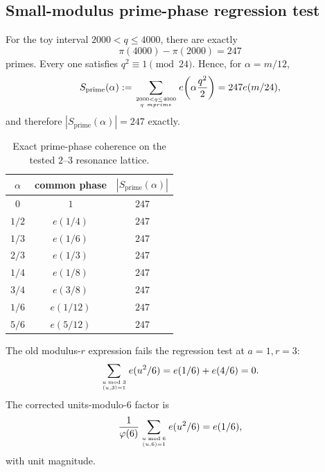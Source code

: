 \documentclass[11pt]{article}
\theoremstyle{definition}
\theoremstyle{remark}
\newcommand{\1}{\mathbf{1}}
\begin{document}
\subsection{Small-modulus prime-phase regression test}
\label{subsec:numerical-prime-resonance}

For the toy interval $2000<q\le4000$, there are exactly
\begin{equation}
 \pi(4000)-\pi(2000)=247
 \label{eq:toy-prime-count}
\end{equation}
primes.  Every one satisfies $q^2\equiv1\pmod{24}$.  Hence, for
$\alpha=m/12$,
\begin{equation}
 S_{\mathrm{prime}}(\alpha)
 :=\sum_{2000<q\le4000\atop q\ {
m prime}}
 e\!\left(\alpha\frac{q^2}{2}\right)
 =247e(m/24),
 \label{eq:toy-prime-resonance}
\end{equation}
and therefore $|S_{\mathrm{prime}}(\alpha)|=247$ exactly.

\begin{table}[htbp]
\centering
\caption{Exact prime-phase coherence on the tested $2$--$3$ resonance lattice.}
\label{tab:toy-prime-resonance}
\small
\begin{tabular}{ccc}
\toprule
$\alpha$ & common phase & $|S_{\mathrm{prime}}(\alpha)|$\\
\midrule
$0$ & $1$ & $247$\\
$1/2$ & $e(1/4)$ & $247$\\
$1/3$ & $e(1/6)$ & $247$\\
$2/3$ & $e(1/3)$ & $247$\\
$1/4$ & $e(1/8)$ & $247$\\
$3/4$ & $e(3/8)$ & $247$\\
$1/6$ & $e(1/12)$ & $247$\\
$5/6$ & $e(5/12)$ & $247$\\
\bottomrule
\end{tabular}
\end{table}

The old modulus-$r$ expression fails the regression test at $a=1,r=3$:
\begin{equation}
 \sum_{u\bmod3\atop(u,3)=1}e(u^2/6)=e(1/6)+e(4/6)=0.
 \label{eq:old-r3-regression-failure}
\end{equation}
The corrected units-modulo-$6$ factor is
\begin{equation}
 \frac1{\varphi(6)}
 \sum_{u\bmod6\atop(u,6)=1}e(u^2/6)
 =e(1/6),
 \label{eq:correct-r3-regression}
\end{equation}
with unit magnitude.
\end{document}
